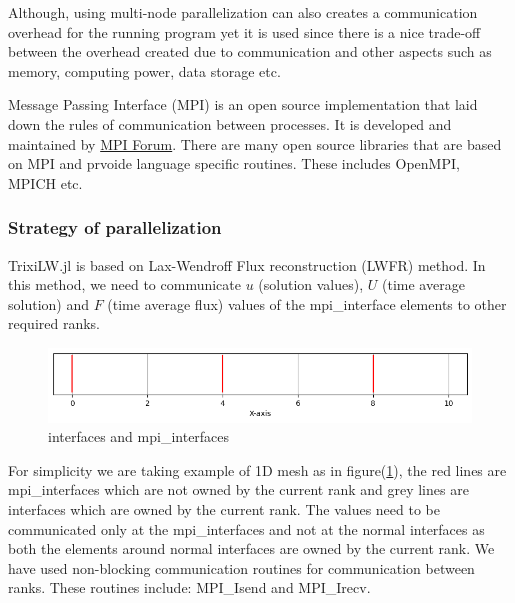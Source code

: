 Although, using multi-node parallelization can also creates a communication overhead for the running program yet it is used since there is a nice trade-off between the overhead created due to communication and other aspects such as memory, computing power, data storage etc. 

Message Passing Interface (MPI) is an open source implementation that laid down the rules of communication between processes. It is developed and maintained by \href{https://www.mpi-forum.org/}{MPI Forum}.
There are many open source libraries that are based on MPI and prvoide language specific routines. These includes {\ttfamily OpenMPI, MPICH} etc.

\subsubsection{Strategy of parallelization}
{\ttfamily TrixiLW.jl} is based on Lax-Wendroff Flux reconstruction (LWFR) method. In this method, we need to communicate $u$ (solution values), $U$ (time average solution) and $F$ (time average flux) values of the mpi\_interface elements to other required ranks.

\begin{figure}[!ht]
    \centering
    \includegraphics[width=0.9\linewidth]{attachments/1Dmesh.png}
    \caption{interfaces and mpi\_interfaces}
    \label{fig:1}
\end{figure}
For simplicity we are taking example of 1D mesh as in figure(\ref{fig:1}), the red lines are {\ttfamily mpi\_interfaces} which are not owned by the current rank and grey lines are {\ttfamily interfaces} which are owned by the current rank.
The values need to be communicated only at the {\ttfamily mpi\_interfaces}
and not at the normal {\ttfamily interfaces} as both the elements around normal {\ttfamily interfaces} are owned by the current rank. We have used non-blocking communication routines for communication between ranks. These routines include: {\ttfamily MPI\_Isend} and {\ttfamily MPI\_Irecv}.

